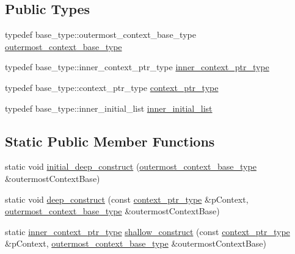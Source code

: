 \subsection*{Public Types}
\begin{DoxyCompactItemize}
\item 
typedef base\+\_\+type\+::outermost\+\_\+context\+\_\+base\+\_\+type \mbox{\hyperlink{classboost_1_1statechart_1_1state_a1ba302317e3eb4b10d0c8424eea5ea67}{outermost\+\_\+context\+\_\+base\+\_\+type}}
\item 
typedef base\+\_\+type\+::inner\+\_\+context\+\_\+ptr\+\_\+type \mbox{\hyperlink{classboost_1_1statechart_1_1state_a4e7f8d979b4f7fcd77ab558f999e8d22}{inner\+\_\+context\+\_\+ptr\+\_\+type}}
\item 
typedef base\+\_\+type\+::context\+\_\+ptr\+\_\+type \mbox{\hyperlink{classboost_1_1statechart_1_1state_a7335c17e6e761eb1b50acdc383fbc080}{context\+\_\+ptr\+\_\+type}}
\item 
typedef base\+\_\+type\+::inner\+\_\+initial\+\_\+list \mbox{\hyperlink{classboost_1_1statechart_1_1state_a92bffaa636b23b9a1176bf011e989794}{inner\+\_\+initial\+\_\+list}}
\end{DoxyCompactItemize}
\subsection*{Static Public Member Functions}
\begin{DoxyCompactItemize}
\item 
static void \mbox{\hyperlink{classboost_1_1statechart_1_1state_acb18541c13a54a7dcaecece53bcbf8df}{initial\+\_\+deep\+\_\+construct}} (\mbox{\hyperlink{classboost_1_1statechart_1_1simple__state_a50f21d7a7d6632eb34430e74cbad3197}{outermost\+\_\+context\+\_\+base\+\_\+type}} \&outermost\+Context\+Base)
\item 
static void \mbox{\hyperlink{classboost_1_1statechart_1_1state_aed04b0d2e74450ef8d1a2dd821001e39}{deep\+\_\+construct}} (const \mbox{\hyperlink{classboost_1_1statechart_1_1simple__state_ac7e361322d53b3f57976ff23056b59e7}{context\+\_\+ptr\+\_\+type}} \&p\+Context, \mbox{\hyperlink{classboost_1_1statechart_1_1simple__state_a50f21d7a7d6632eb34430e74cbad3197}{outermost\+\_\+context\+\_\+base\+\_\+type}} \&outermost\+Context\+Base)
\item 
static \mbox{\hyperlink{classboost_1_1statechart_1_1simple__state_ad6d3233a11a23e91b4cc9edcae799379}{inner\+\_\+context\+\_\+ptr\+\_\+type}} \mbox{\hyperlink{classboost_1_1statechart_1_1state_afd7debb4aea8513b34941ba356767701}{shallow\+\_\+construct}} (const \mbox{\hyperlink{classboost_1_1statechart_1_1simple__state_ac7e361322d53b3f57976ff23056b59e7}{context\+\_\+ptr\+\_\+type}} \&p\+Context, \mbox{\hyperlink{classboost_1_1statechart_1_1simple__state_a50f21d7a7d6632eb34430e74cbad3197}{outermost\+\_\+context\+\_\+base\+\_\+type}} \&outermost\+Context\+Base)
\end{DoxyCompactItemize}
